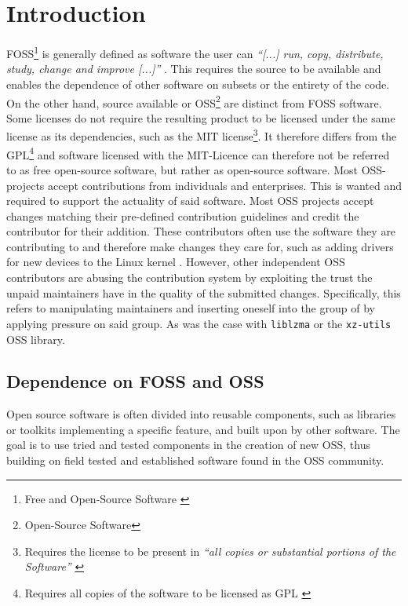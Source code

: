 \section{Introduction}

FOSS\footnote{Free and Open-Source Software \cite{stallmann2021copyleft}} is
generally defined as software the user can \textit{``[...] run, copy,
distribute, study, change and improve [...]''} \cite{fsf2024whycopylef}. This
requires the source to be available and enables the dependence of other
software on subsets or the entirety of the code. On the other hand, source
available or OSS\footnote{Open-Source Software} are distinct from FOSS
software. Some licenses do not require the resulting product to be licensed
under the same license as its dependencies, such as the MIT
license\footnote{Requires the license to be present in \textit{``all copies or
substantial portions of the Software''} \cite{osorg2024mit}}. It therefore
differs from the GPL\footnote{Requires all copies of the software to be
licensed as GPL \cite{osorg2024gpl}} and software licensed with the MIT-Licence
can therefore not be referred to as free open-source software, but rather as
open-source software. \newline Most OSS-projects accept contributions from
individuals and enterprises. This is wanted and required to support the
actuality of said software. Most OSS projects accept changes matching their
pre-defined contribution guidelines and credit the contributor for their
addition. These contributors often use the software they are contributing to
and therefore make changes they care for, such as adding drivers for new
devices to the Linux kernel \cite{linuxUnknownDevicedrivers}. \newline However,
other independent OSS contributors are abusing the contribution system by
exploiting the trust the unpaid maintainers have in the quality of the
submitted changes. Specifically, this refers to manipulating maintainers and
inserting oneself into the group of by applying pressure on said group. As was
the case with \texttt{liblzma} or the \texttt{xz-utils} OSS library.

\subsection{Dependence on FOSS and OSS}

Open source software is often divided into reusable components, such as
libraries or toolkits implementing a specific feature, and built upon by other
software. The goal is to use tried and tested components in the creation of new
OSS, thus building on field tested and established software found in the OSS
community.

